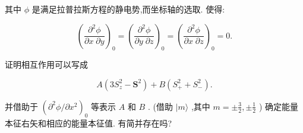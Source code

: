 其中 $\phi$ 是满足拉普拉斯方程的静电势,而坐标轴的选取. 使得:

$$
{\left( \frac{{\partial }^{2}\phi }{\partial x\;\partial y}\right) }_{0} = {\left( \frac{{\partial }^{2}\phi }{\partial y\;\partial z}\right) }_{0} = {\left( \frac{{\partial }^{2}\phi }{\partial x\;\partial z}\right) }_{0} = 0.
$$

证明相互作用可以写成

$$
A\left( {3{S}_{z}^{2} - {\mathbf{S}}^{2}}\right) + B\left( {{S}_{ + }^{2} + {S}_{ - }^{2}}\right) .
$$

并借助于 ${\left( {\partial }^{2}\phi /\partial {x}^{2}\right) }_{0}$ 等表示 $A$ 和 $B$ . (借助 $|m\rangle$ ,其中 $m = \pm \frac{3}{2}, \pm \frac{1}{2}$ ) 确定能量本征右矢和相应的能量本征值. 有简并存在吗?



	
	
	
	
	
\ifx\allfiles\undefined

	\else
	\fi
